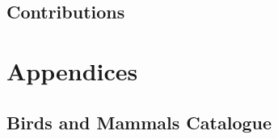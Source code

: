 \documentclass[11pt,nofootinbib]{report}
\begin{document}
		\section{Contributions}\label{Contributions}
		
		
	    
	    {}

		\newpage
	\chapter{Appendices}\label{Apendices}
		\section{Birds and Mammals Catalogue} 
		\label{AppendixBirds}
		\newpage
	
		
	
    
\end{document}
